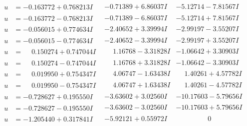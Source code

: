 \documentclass[1p]{elsarticle_modified}
\theoremstyle{definition}
\begin{document}
$$\begin{array}{c|c|c}
\begin{aligned}
u &= -0.163772 + 0.768213 I\end{aligned}
 & -0.71389 + 6.86037 I & -5.12714 - 7.81567 I \\ \hline\begin{aligned}
u &= -0.163772 - 0.768213 I\end{aligned}
 & -0.71389 - 6.86037 I & -5.12714 + 7.81567 I \\ \hline\begin{aligned}
u &= -0.056015 + 0.774634 I\end{aligned}
 & -2.40652 + 3.39994 I & -2.99197 - 3.55207 I \\ \hline\begin{aligned}
u &= -0.056015 - 0.774634 I\end{aligned}
 & -2.40652 - 3.39994 I & -2.99197 + 3.55207 I \\ \hline\begin{aligned}
u &= \phantom{-}0.150274 + 0.747044 I\end{aligned}
 & \phantom{-}1.16768 - 3.31828 I & -1.06642 + 3.30903 I \\ \hline\begin{aligned}
u &= \phantom{-}0.150274 - 0.747044 I\end{aligned}
 & \phantom{-}1.16768 + 3.31828 I & -1.06642 - 3.30903 I \\ \hline\begin{aligned}
u &= \phantom{-}0.019950 + 0.754347 I\end{aligned}
 & \phantom{-}4.06747 - 1.63438 I & \phantom{-}1.40261 + 4.57782 I \\ \hline\begin{aligned}
u &= \phantom{-}0.019950 - 0.754347 I\end{aligned}
 & \phantom{-}4.06747 + 1.63438 I & \phantom{-}1.40261 - 4.57782 I \\ \hline\begin{aligned}
u &= -0.728627 + 0.195550 I\end{aligned}
 & -3.63602 + 3.02560 I & -10.17603 - 5.79656 I \\ \hline\begin{aligned}
u &= -0.728627 - 0.195550 I\end{aligned}
 & -3.63602 - 3.02560 I & -10.17603 + 5.79656 I \\ \hline\begin{aligned}
u &= -1.205440 + 0.317841 I\end{aligned}
 & -5.92121 + 0.55972 I & \phantom{-0.000000 } 0 \\ \hline\begin{aligned}

\end{aligned}
\end{array}$$
\end{document}
